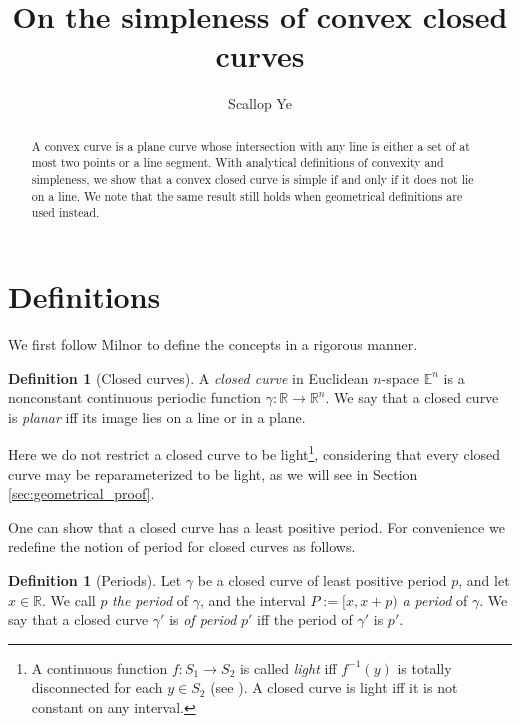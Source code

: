 \documentclass{amsart}
\title{On the simpleness of convex closed curves}
\author{Scallop Ye}
\theoremstyle{definition}
\newtheorem{definition}[proposition]{Definition}
\theoremstyle{remark}
\begin{document}
\begin{abstract}
    A convex curve is a plane curve whose intersection with any
    line is either a set of at most two points or a line segment.
    With analytical definitions of convexity and simpleness,
    we show that a convex closed curve is simple
    if and only if it does not lie on a line.
    We note that the same result still holds when
    geometrical definitions are used instead.
\end{abstract}

\maketitle

\section{Definitions}

We first follow Milnor \cite{milnor} to
define the concepts in a rigorous manner.

\begin{definition}[Closed curves]
    A \emph{closed curve} in Euclidean $n$-space $\mathbb{E}^n$
    is a nonconstant continuous periodic function
    $\gamma:\mathbb{R}\to\mathbb{R}^n$. We say that a closed curve
    is \emph{planar} iff its image lies on a line or in a plane.
\end{definition}

Here we do not restrict a closed curve to be light\footnote{
    A continuous function $f:S_1\to S_2$ is called \emph{light}
    iff $f^{-1}(y)$ is totally disconnected for each $y\in S_2$
    (see \cite[Definition 13.1]{nadler}). A closed curve
    is light iff it is not constant on any interval.
}, considering that every closed curve may be
reparameterized to be light, as we will see in Section
\ref{sec:geometrical_proof}.

One can show that a closed curve has a least positive period.
For convenience we redefine the notion of period for closed curves
as follows.

\begin{definition}[Periods]
    Let $\gamma$ be a closed curve of least positive period $p$,
    and let $x\in\mathbb{R}$. We call $p$ \emph{the period} of $\gamma$,
    and the interval $P:=[x,x+p)$ \emph{a period} of $\gamma$.
    We say that a closed curve $\gamma'$ is \emph{of period} $p'$
    iff the period of $\gamma'$ is $p'$.
\end{definition}
\end{document}
